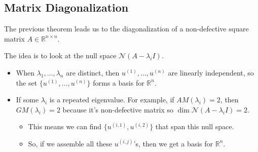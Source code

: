 \subsection{Matrix Diagonalization}
\begin{intuition}
    The previous theorem leads us to the diagonalization of a non-defective square matrix $A \in \mathbb{R}^{n \times n}$. 
    \vspace{1em}

    The idea is to look at the null space $\mathcal{N}(A - \lambda_i I)$. 
    \begin{itemize}
        \item When $\lambda_1, \ldots, \lambda_n$ are distinct, then $u^{(1)}, \ldots, u^{(n)}$ are linearly independent, so the set $\{u^{(1)}, \ldots, u^{(n)}\}$ forms a basis for $\mathbb{R}^n$.
        \item If some $\lambda_i$ is a repeated eigenvalue. For example, if $AM(\lambda_i) = 2$, then $GM(\lambda_i) = 2$ because it's non-defective matrix so $\dim \mathcal{N}(A - \lambda_i I) = 2$. 
        \begin{itemize}
            \item This means we can find $\{u^{(i,1)}, u^{(i,2)}\}$ that span this null space.
            \item So, if we assemble all these $u^{(i,j)}$'s, then we get a basis for $\mathbb{R}^n$.
        \end{itemize}
    \end{itemize}
\end{intuition}

